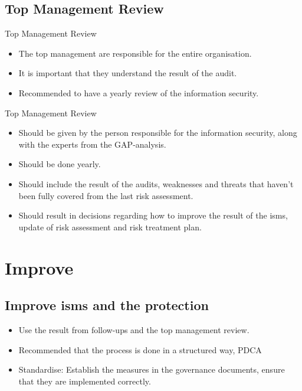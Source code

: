 \documentclass{beamer}
\begin{document}
\subsection{Top Management Review}
\begin{frame}{Top Management Review}
  \begin{itemize}
    \item The top management are responsible for the entire organisation.
    \item It is important that they understand the result of the audit.
    \item Recommended to have a yearly review of the information security.
  \end{itemize}
\end{frame}
\begin{frame}{Top Management Review}
  \begin{itemize}
    \item Should be given by the person responsible for the information
      security, along with the experts from the GAP-analysis.
    \item Should be done yearly.
  \end{itemize}
\end{frame}
\begin{frame}{\insertsubsectionhead}
  \begin{itemize}
    \item Should include the result of the audits, weaknesses and threats that
      haven't been fully covered from the last risk assessment.
    \item Should result in decisions regarding how to improve the result of the
      \ac{isms}, update of risk assessment and risk treatment plan.
  \end{itemize}
\end{frame}


\section{Improve}

\subsection{Improve \ac{isms} and the protection}
\begin{frame}{\insertsubsectionhead}
  \begin{itemize}
    \item Use the result from follow-ups and the top management review.
    \item Recommended that the process is done in a structured way, PDCA
    \item Standardise: Establish the measures in the governance documents, ensure
      that they are implemented correctly.
  \end{itemize}
\end{frame}
\end{document}
